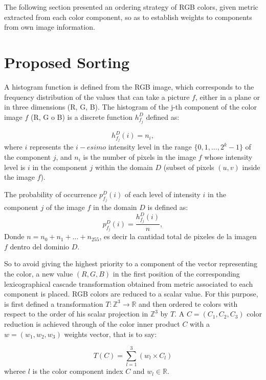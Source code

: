 The following section presented  an ordering strategy of RGB colors, given metric extracted from each color component, so as to establish weights to components from own image information.



 \section{Proposed Sorting}

A histogram function is defined from the RGB image, which corresponds to the frequency distribution of the values that can take a picture $f$, either in a plane or in three dimensions (R, G, B). The histogram of the j-th component of the color image $f$ (R, G o B) is a discrete function $h_{f_j}^{D}$ defined as:%

\begin{equation}
\label{histograma}
   h_{f_j}^{D}(i) = n_i,
\end{equation} 
where ${i}$ represents the $i-esimo$ intensity level in the range $\{0,1,...,2^k-1\}$ 
of the component $j$, and $n_i$ is the number of pixels in the image $f$ whose intensity level is $i$ in the component $j$ 
within the domain $D$ (subset of pixels $(u,v)$ inside the image $f$).

The probability of occurrence $p_{f_j}^{D}(i)$ of each level of intensity $i$ in the component $j$ of the image $f$ in the domain $D$ is defined as:
\begin{equation}
\label{probabilidad}
   p_{f_j}^{D}(i) = \frac{h_{f_j}^{D}(i)}{n},
\end{equation} Donde $n = n_0 + n_1 + ... + n_{255}$, es decir la cantidad total de pixeles de la imagen $f$ dentro del dominio $D$. 

So to avoid giving the highest priority to a component of the vector representing the color, a new value $(R,G,B)$ in the first position of the corresponding lexicographical cascade transformation obtained from metric associated to each component is placed.
RGB colors are reduced to a scalar value. For this purpose, is first defined a transformation $T:\mathbb{Z}^3 \rightarrow \mathbb{R}$ and then ordered te colors with respect to the order of his scalar projection in $\mathbb{Z}^3$ by $T$.
A $
C=(C_1,C_2,C_3)$ color reduction is achieved through of the color inner product $C$ with a $w=(w_1,w_2,w_3) $ weights vector, that is to say:

\begin{equation}
\label{Transformacion}
T(C)= \sum_{l=1}^3(w_l \times C_l)
\end{equation}  
wheree $l$ is the color component index $C$ and $w_l \in \mathbb{R}$. 

